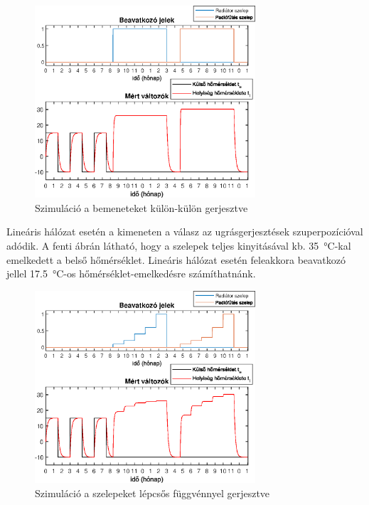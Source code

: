 \begin{figure}[H]
	\centering
	\includegraphics[trim=0 0 0 0, clip,width=0.73\textwidth]{figures/valve-step}
	\caption{Szimuláció a bemeneteket külön-külön gerjesztve}
	\label{fig:valve-step}
\end{figure}
Lineáris hálózat esetén a kimeneten a válasz az ugrásgerjesztések szuperpozícióval adódik. A fenti ábrán látható, hogy a szelepek teljes kinyitásával kb. \SI{35}{\celsius}-kal emelkedett a belső hőmérséklet. Lineáris hálózat esetén feleakkora beavatkozó jellel \SI{17.5}{\celsius}-os hőmérséklet-emelkedésre számíthatnánk.
\begin{figure}[H]
	\centering
	\includegraphics[trim=0 0 0 0, clip,width=0.73\textwidth]{figures/valve-stair}
	\caption{Szimuláció a szelepeket lépcsős függvénnyel gerjesztve}
	\label{fig:valve-stair}
\end{figure}

